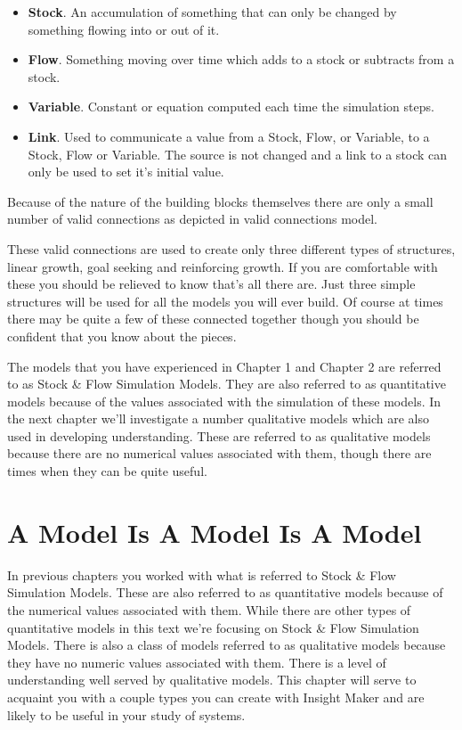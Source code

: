 \documentclass[]{memoir}
\begin{document}
\begin{itemize}
\itemsep1pt\parskip0pt
\item
  \textbf{Stock}. An accumulation of something that can only be changed
  by something flowing into or out of it.
\item
  \textbf{Flow}. Something moving over time which adds to a stock or
  subtracts from a stock.
\item
  \textbf{Variable}. Constant or equation computed each time the
  simulation steps.
\item
  \textbf{Link}. Used to communicate a value from a Stock, Flow, or
  Variable, to a Stock, Flow or Variable. The source is not changed and
  a link to a stock can only be used to set it's initial value.
\end{itemize}

Because of the nature of the building blocks themselves there are only a
small number of valid connections as depicted in valid connections
model.

These valid connections are used to create only three different types of
structures, linear growth, goal seeking and reinforcing growth. If you
are comfortable with these you should be relieved to know that's all
there are. Just three simple structures will be used for all the models
you will ever build. Of course at times there may be quite a few of
these connected together though you should be confident that you know
about the pieces.

The models that you have experienced in Chapter 1 and Chapter 2 are
referred to as Stock \& Flow Simulation Models. They are also referred
to as quantitative models because of the values associated with the
simulation of these models. In the next chapter we'll investigate a
number qualitative models which are also used in developing
understanding. These are referred to as qualitative models because there
are no numerical values associated with them, though there are times
when they can be quite useful.

\chapter{A Model Is A Model Is A Model}

In previous chapters you worked with what is referred to Stock \& Flow
Simulation Models. These are also referred to as quantitative models
because of the numerical values associated with them. While there are
other types of quantitative models in this text we're focusing on Stock
\& Flow Simulation Models. There is also a class of models referred to
as qualitative models because they have no numeric values associated
with them. There is a level of understanding well served by qualitative
models. This chapter will serve to acquaint you with a couple types you
can create with Insight Maker and are likely to be useful in your study
of systems.
\end{document}
